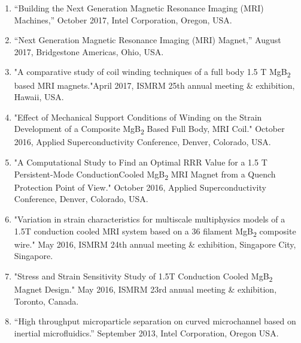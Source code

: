 \documentclass[11pt, letterpaper]{article}
\begin{document}
\begin{enumerate}[label=I\arabic*., itemsep=-1pt, topsep=2pt]
        \item “Building the Next Generation Magnetic Resonance Imaging (MRI) Machines,” October 2017, Intel Corporation, Oregon, USA.
        \item “Next Generation Magnetic Resonance Imaging (MRI) Magnet,” August 2017, Bridgestone Americas, Ohio, USA.
        \item "A comparative study of coil winding techniques of a full body 1.5 T MgB\textsubscript{2} based MRI magnets."April 2017, ISMRM 25th annual meeting \& exhibition, Hawaii, USA.
        \item "Effect of Mechanical Support Conditions of Winding on the Strain Development of a Composite MgB\textsubscript{2} Based Full Body, MRI Coil." October 2016, Applied Superconductivity Conference, Denver, Colorado, USA.
        \item "A Computational Study to Find an Optimal RRR Value for a 1.5 T Persistent-Mode ConductionCooled MgB\textsubscript{2} MRI Magnet from a Quench Protection Point of View." October 2016, Applied Superconductivity Conference, Denver, Colorado, USA.
        \item "Variation in strain characteristics for multiscale multiphysics models of a 1.5T conduction cooled MRI system based on a 36 filament MgB\textsubscript{2} composite wire." May 2016, ISMRM 24th annual meeting \& exhibition, Singapore City, Singapore.
        \item "Stress and Strain Sensitivity Study of 1.5T Conduction Cooled MgB\textsubscript{2} Magnet Design." May 2016, ISMRM 23rd annual meeting \& exhibition, Toronto, Canada.
        \item “High throughput microparticle separation on curved microchannel based on inertial microfluidics.” September 2013, Intel Corporation, Oregon USA.
    \end{enumerate}    
  
\end{document}
